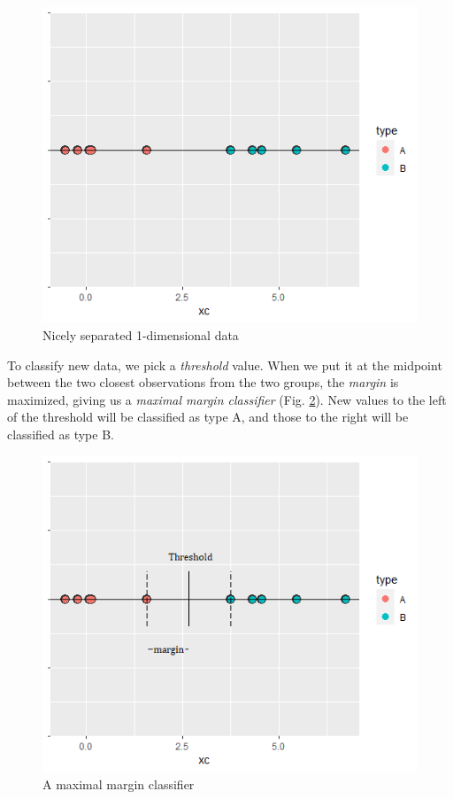\documentclass[
]{book}
\theoremstyle{definition}
\theoremstyle{definition}
\theoremstyle{definition}
\theoremstyle{definition}
\theoremstyle{remark}
\begin{document}
\begin{figure}

{\centering \includegraphics[width=0.7\linewidth]{images/svm0} 

}

\caption{Nicely separated 1-dimensional data}\label{fig:svm1}
\end{figure}

To classify new data, we pick a \emph{threshold} value. When we put it at the midpoint between the two closest observations from the two groups, the \emph{margin} is maximized, giving us a \emph{maximal margin classifier} (Fig. \ref{fig:svm1a}). New values to the left of the threshold will be classified as type A, and those to the right will be classified as type B.

\begin{figure}

{\centering \includegraphics[width=0.7\linewidth]{images/svm1a} 

}

\caption{A maximal margin classifier}\label{fig:svm1a}
\end{figure}
\end{document}
